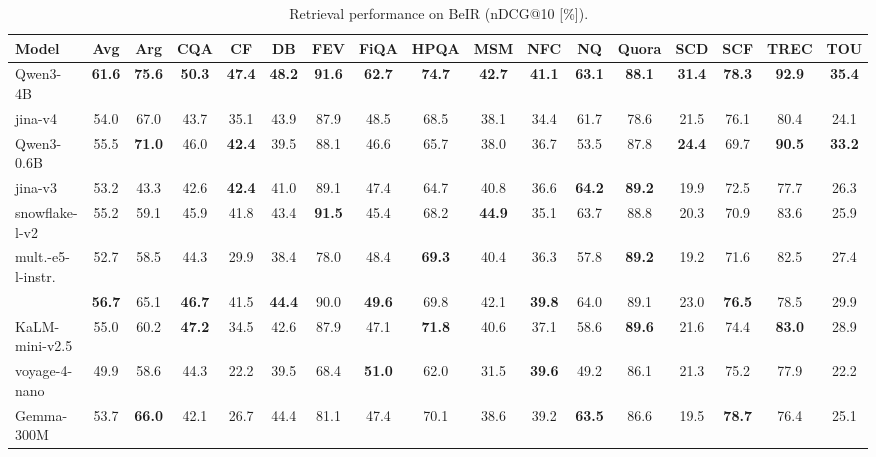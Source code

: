 \documentclass[11pt]{article}
\begin{document}
\begin{table}[H]
\caption{Retrieval performance on BeIR (nDCG@10 [\%]).}
\label{tab:beir_retrieval}
\centering
\small
\setlength{\tabcolsep}{1.5pt}
\begin{tabular}{l*{16}{c}}
\toprule
\textbf{Model} & \textbf{Avg} & \textbf{Arg} & \textbf{CQA} & \textbf{CF} & \textbf{DB} & \textbf{FEV} & \textbf{FiQA} & \textbf{HPQA} & \textbf{MSM} & \textbf{NFC} & \textbf{NQ} & \textbf{Quora} & \textbf{SCD} & \textbf{SCF} & \textbf{TREC} & \textbf{TOU} \\
\midrule
Qwen3-4B & \textbf{61.6} & \textbf{75.6} & \textbf{50.3} & \textbf{47.4} & \textbf{48.2} & \textbf{91.6} & \textbf{62.7} & \textbf{74.7} & \textbf{42.7} & \textbf{41.1} & \textbf{63.1} & \textbf{88.1} & \textbf{31.4} & \textbf{78.3} & \textbf{92.9} & \textbf{35.4} \\
jina-v4 & 54.0 & 67.0 & 43.7 & 35.1 & 43.9 & 87.9 & 48.5 & 68.5 & 38.1 & 34.4 & 61.7 & 78.6 & 21.5 & 76.1 & 80.4 & 24.1 \\
\midrule
Qwen3-0.6B & 55.5 & \textbf{71.0} & 46.0 & \textbf{42.4} & 39.5 & 88.1 & 46.6 & 65.7 & 38.0 & 36.7 & 53.5 & 87.8 & \textbf{24.4} & 69.7 & \textbf{90.5} & \textbf{33.2} \\
jina-v3 & 53.2 & 43.3 & 42.6 & \textbf{42.4} & 41.0 & 89.1 & 47.4 & 64.7 & 40.8 & 36.6 & \textbf{64.2} & \textbf{89.2} & 19.9 & 72.5 & 77.7 & 26.3 \\
snowflake-l-v2 & 55.2 & 59.1 & 45.9 & 41.8 & 43.4 & \textbf{91.5} & 45.4 & 68.2 & \textbf{44.9} & 35.1 & 63.7 & 88.8 & 20.3 & 70.9 & 83.6 & 25.9 \\
mult.-e5-l-instr. & 52.7 & 58.5 & 44.3 & 29.9 & 38.4 & 78.0 & 48.4 & \textbf{69.3} & 40.4 & 36.3 & 57.8 & \textbf{89.2} & 19.2 & 71.6 & 82.5 & 27.4 \\
\JEmbeddingVFiveTextSmallShort{} & \textbf{56.7} & 65.1 & \textbf{46.7} & 41.5 & \textbf{44.4} & 90.0 & \textbf{49.6} & 69.8 & 42.1 & \textbf{39.8} & 64.0 & 89.1 & 23.0 & \textbf{76.5} & 78.5 & 29.9 \\
\midrule
KaLM-mini-v2.5 & 55.0 & 60.2 & \textbf{47.2} & 34.5 & 42.6 & 87.9 & 47.1 & \textbf{71.8} & 40.6 & 37.1 & 58.6 & \textbf{89.6} & 21.6 & 74.4 & \textbf{83.0} & 28.9 \\
voyage-4-nano & 49.9 & 58.6 & 44.3 & 22.2 & 39.5 & 68.4 & \textbf{51.0} & 62.0 & 31.5 & \textbf{39.6} & 49.2 & 86.1 & 21.3 & 75.2 & 77.9 & 22.2 \\
Gemma-300M & 53.7 & \textbf{66.0} & 42.1 & 26.7 & 44.4 & 81.1 & 47.4 & 70.1 & 38.6 & 39.2 & \textbf{63.5} & 86.6 & 19.5 & \textbf{78.7} & 76.4 & 25.1 \\

\end{tabular}
\end{table}
\end{document}
